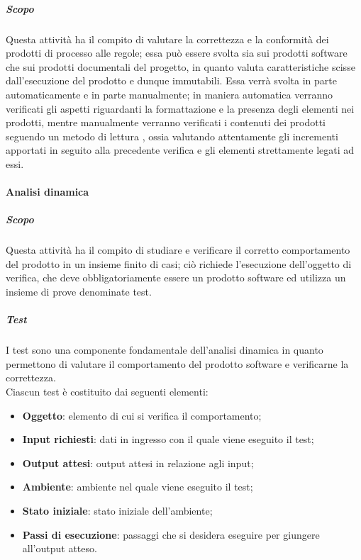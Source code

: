 \subparagraph{Scopo}
Questa attività ha il compito di valutare la correttezza e la conformità dei prodotti di processo alle regole; essa può essere svolta sia
sui prodotti software che sui prodotti documentali del progetto, in quanto valuta caratteristiche scisse dall'esecuzione del prodotto e
dunque immutabili. Essa verrà svolta in parte automaticamente e in parte manualmente; in maniera automatica verranno verificati gli
aspetti riguardanti la formattazione e la presenza degli elementi nei prodotti, mentre manualmente verranno verificati i contenuti dei
prodotti seguendo un metodo di lettura , ossia valutando attentamente gli incrementi apportati in seguito alla
precedente verifica e gli elementi strettamente legati ad essi.

\paragraph{Analisi dinamica}
\label{ssub:verifica:analisi_dinamica}

\subparagraph{Scopo}

Questa attività ha il compito di studiare e verificare il corretto comportamento del prodotto in un insieme finito di casi; ciò richiede
l'esecuzione dell'oggetto di verifica, che deve obbligatoriamente essere un prodotto software ed utilizza un insieme di prove denominate
test.

\subparagraph{Test}
\label{par:verifica:test}

I test sono una componente fondamentale dell'analisi dinamica in quanto permettono di valutare il comportamento del prodotto software e
verificarne la correttezza.\\
Ciascun test è costituito dai seguenti elementi:
\begin{itemize}
    \item \textbf{Oggetto}: elemento di cui si verifica il comportamento;
    \item \textbf{Input richiesti}: dati in ingresso con il quale viene eseguito il test;
    \item \textbf{Output attesi}: output attesi in relazione agli input;
    \item \textbf{Ambiente}: ambiente nel quale viene eseguito il test;
    \item \textbf{Stato iniziale}: stato iniziale dell'ambiente;
    \item \textbf{Passi di esecuzione}: passaggi che si desidera eseguire per giungere all'output atteso.
\end{itemize}

